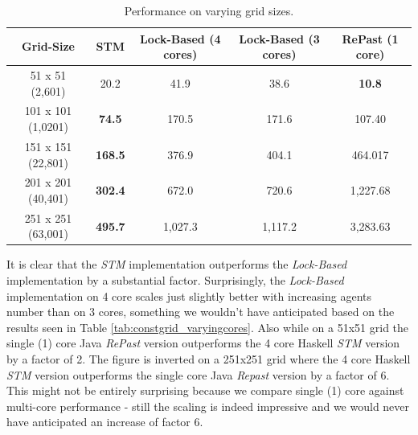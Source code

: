 \begin{table}
	\centering
  	\begin{tabular}{ c || c | c | c | c }
        Grid-Size          & STM              & Lock-Based (4 cores) & Lock-Based (3 cores) & RePast (1 core) \\ \hline \hline 
   		51 x 51 (2,601)    & 20.2             & 41.9                 & 38.6                 & \textbf{10.8}   \\ \hline
   		101 x 101 (1,0201) & \textbf{74.5}    & 170.5                & 171.6                & 107.40          \\ \hline
   		151 x 151 (22,801) & \textbf{168.5}   & 376.9                & 404.1                & 464.017         \\ \hline
   		201 x 201 (40,401) & \textbf{302.4}   & 672.0                & 720.6                & 1,227.68        \\ \hline
   		251 x 251 (63,001) & \textbf{495.7}   & 1,027.3              & 1,117.2              & 3,283.63        \\ \hline \hline
  	\end{tabular}

  	\caption{Performance on varying grid sizes.}
	\label{tab:varyinggrid_constcores}
\end{table}

It is clear that the \textit{STM} implementation outperforms the \textit{Lock-Based} implementation by a substantial factor. Surprisingly, the \textit{Lock-Based} implementation on 4 core scales just slightly better with increasing agents number than on 3 cores, something we wouldn't have anticipated based on the results seen in Table \ref{tab:constgrid_varyingcores}. Also  while on a 51x51 grid the single (1) core Java \textit{RePast} version outperforms the 4 core Haskell \textit{STM} version by a factor of 2. The figure is inverted on a 251x251 grid where the 4 core Haskell \textit{STM} version outperforms the single core Java \textit{Repast} version by a factor of 6. This might not be entirely surprising because we compare single (1) core against multi-core performance - still the scaling is indeed impressive and we would never have anticipated an increase of factor 6.

